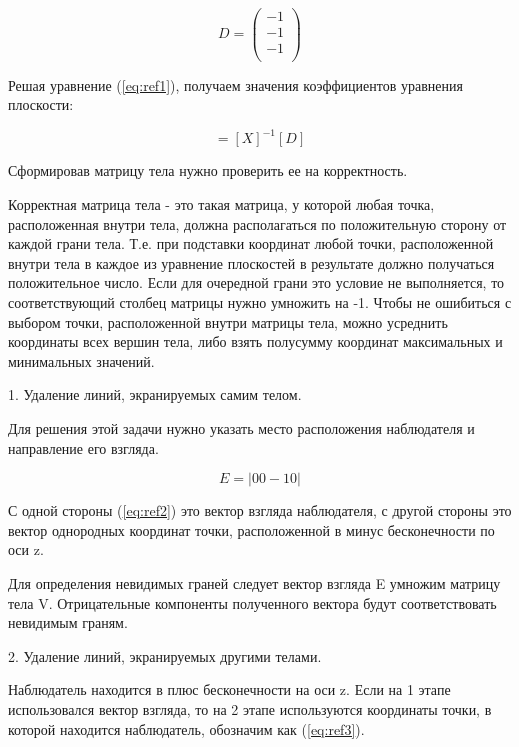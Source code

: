 ~

\begin{equation}
	D = \left(
	\begin{array}{c}
			-1 \\
			-1 \\
			-1 \\
		\end{array}
	\right)
\end{equation}

Решая уравнение (\ref{eq:ref1}), получаем значения коэффициентов уравнения плоскости:

\begin{equation}
	[C] = [X]^{-1}[D]
\end{equation}

Сформировав матрицу тела нужно проверить ее на корректность.

Корректная матрица тела - это такая матрица, у которой любая точка, расположенная внутри тела, должна располагаться по положительную сторону от каждой грани тела. Т.е. при подставки координат любой точки, расположенной внутри тела в каждое из уравнение плоскостей в результате должно получаться положительное число. Если для очередной грани это условие не выполняется, то соответствующий столбец матрицы нужно умножить на -1. Чтобы не ошибиться с выбором точки, расположенной внутри матрицы тела, можно усреднить координаты всех вершин тела, либо взять полусумму координат максимальных и минимальных значений.

1. Удаление линий, экранируемых самим телом.

Для решения этой задачи нужно указать место расположения наблюдателя и направление его взгляда.

\begin{equation}
	E = |00-10|
	\label{eq:ref2}
\end{equation}

С одной стороны (\ref{eq:ref2}) это вектор взгляда наблюдателя, с другой стороны это вектор однородных координат точки, расположенной в минус бесконечности по оси z.

Для определения невидимых граней следует вектор взгляда E умножим матрицу тела V. Отрицательные компоненты полученного вектора будут соответствовать невидимым граням.

2. Удаление линий, экранируемых другими телами.

Наблюдатель находится в плюс бесконечности на оси z. Если на 1 этапе использовался вектор взгляда, то на 2 этапе используются координаты точки, в которой находится наблюдатель, обозначим как (\ref{eq:ref3}).

